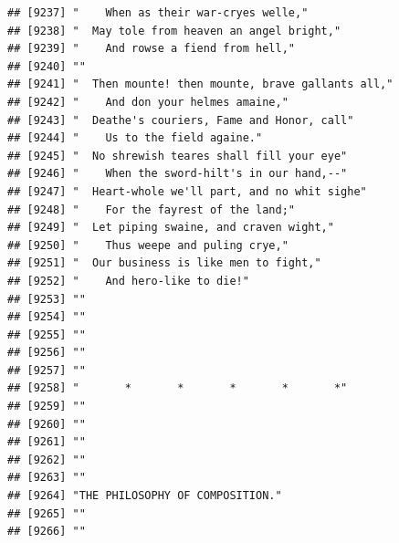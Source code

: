 \documentclass{article}\usepackage[]{graphicx}\usepackage[]{color}
\makeatletter
\newenvironment{kframe}{%
 \def\at@end@of@kframe{}%
 \ifinner\ifhmode%
  \def\at@end@of@kframe{\end{minipage}}%
  \begin{minipage}{\columnwidth}%
 \fi\fi%
 \def\FrameCommand##1{\hskip\@totalleftmargin \hskip-\fboxsep
 \colorbox{shadecolor}{##1}\hskip-\fboxsep
     \hskip-\linewidth \hskip-\@totalleftmargin \hskip\columnwidth}%
 \MakeFramed {\advance\hsize-\width
   \@totalleftmargin\z@ \linewidth\hsize
   \@setminipage}}%
 {\par\unskip\endMakeFramed%
 \at@end@of@kframe}
\newenvironment{knitrout}{}{} %
\makeatother
\begin{document}
\begin{knitrout}
\begin{kframe}
\begin{verbatim}
## [9237] "    When as their war-cryes welle,"                                          
## [9238] "  May tole from heaven an angel bright,"                                     
## [9239] "    And rowse a fiend from hell,"                                            
## [9240] ""                                                                            
## [9241] "  Then mounte! then mounte, brave gallants all,"                             
## [9242] "    And don your helmes amaine,"                                             
## [9243] "  Deathe's couriers, Fame and Honor, call"                                   
## [9244] "    Us to the field againe."                                                 
## [9245] "  No shrewish teares shall fill your eye"                                    
## [9246] "    When the sword-hilt's in our hand,--"                                    
## [9247] "  Heart-whole we'll part, and no whit sighe"                                 
## [9248] "    For the fayrest of the land;"                                            
## [9249] "  Let piping swaine, and craven wight,"                                      
## [9250] "    Thus weepe and puling crye,"                                             
## [9251] "  Our business is like men to fight,"                                        
## [9252] "    And hero-like to die!"                                                   
## [9253] ""                                                                            
## [9254] ""                                                                            
## [9255] ""                                                                            
## [9256] ""                                                                            
## [9257] ""                                                                            
## [9258] "       *       *       *       *       *"                                    
## [9259] ""                                                                            
## [9260] ""                                                                            
## [9261] ""                                                                            
## [9262] ""                                                                            
## [9263] ""                                                                            
## [9264] "THE PHILOSOPHY OF COMPOSITION."                                              
## [9265] ""                                                                            
## [9266] ""                                                                            

\end{verbatim}
\end{kframe}
\end{knitrout}
\end{document}
